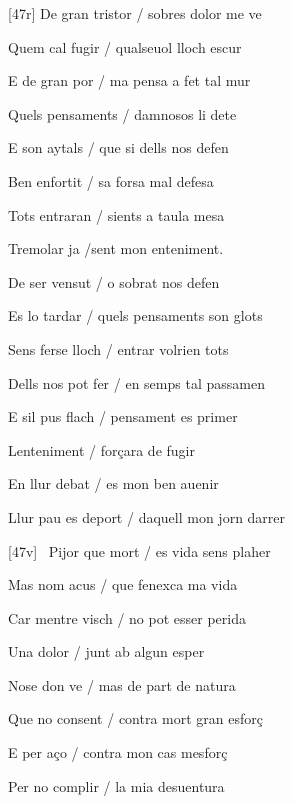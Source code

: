 \documentclass[12pt]{article}
\begin{document}
\begin{estrofa}

 [47r] De gran tristor / sobres dolor me ve

 Quem cal fugir / qualseuol lloch escur

 E de gran por / ma pensa a fet tal mur

 Quels pensaments / damnosos li dete

 E son aytals / que si dells nos defen

 Ben enfortit / sa forsa mal defesa

 Tots entraran / sients a taula mesa

 Tremolar ja /sent mon enteniment.

\end{estrofa}



\begin{estrofa}

 De ser vensut / o sobrat nos defen

 Es lo tardar / quels pensaments son glots

 Sens ferse lloch / entrar volrien tots

 Dells nos pot fer / en semps tal passamen

 E sil pus flach / pensament es primer

 Lenteniment / for\c{c}ara de fugir

 En llur debat / es mon ben auenir

 Llur pau es deport / daquell mon jorn darrer

\end{estrofa}



\begin{estrofa}

 [47v] \textparagraph\  Pijor que mort / es vida sens plaher

 Mas nom acus / que fenexca ma vida

 Car mentre visch / no pot esser perida

 Una dolor / junt ab algun esper

 Nose don ve / mas de part de natura

 Que no consent / contra mort gran esfor\c{c}

 E per a\c{c}o / contra mon cas mesfor\c{c}

 Per no complir / la mia desuentura

\end{estrofa}





\begin{estrofaBuida}


\end{estrofaBuida}
\end{document}
